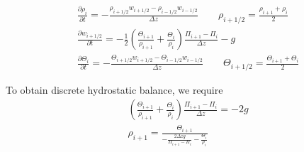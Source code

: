 \documentclass{report}
\begin{document}
\begin{align*}
&\frac{\partial \rho_{i}}{\partial t} = - \frac{ \rho_{i+1/2} w_{i+1/2} - \rho_{i-1/2} w_{i-1/2} }{\Delta z}  \qquad \rho_{i+1/2} = \frac{ \rho_{i+1} +  \rho_{i}}{2}\\
&\frac{\partial w_{i+1/2}}{\partial t} = - \frac{1}{2}\left(\frac{ \Theta_{i+1}}{\rho_{i+1}} + \frac{ \Theta_{i}}{\rho_{i}}\right)\frac{ \Pi_{i+1}- \Pi_{i}}{\Delta z} - g \\
&\frac{\partial \Theta_{i}}{\partial t} = - \frac{\Theta _{i+1/2} w_{i+1/2} -  \Theta _{i-1/2} w_{i-1/2}   }{\Delta z} \qquad \Theta _{i+1/2} = \frac{\Theta _{i+1} + \Theta _{i}}{2}
\end{align*}

To obtain discrete hydrostatic balance, we require
\begin{align*}
   &\left(\frac{ \Theta_{i+1}}{\rho_{i+1}} + \frac{ \Theta_{i}}{\rho_{i}}\right)\frac{ \Pi_{i+1}- \Pi_{i}}{\Delta z}  = -2g \\
   & \rho_{i+1} = \frac{\Theta_{i+1}}{- \frac{2\Delta z g}{ \Pi_{i+1}- \Pi_{i} } -  \frac{ \Theta_{i}}{\rho_{i}}}
\end{align*}
\end{document}
